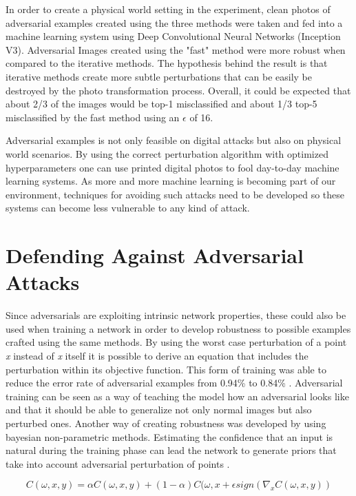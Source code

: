 In order to create a physical world setting in the experiment, clean photos of adversarial examples created using the three methods were taken and fed into a machine learning system using Deep Convolutional Neural Networks (Inception V3). Adversarial Images created using the "fast" method were more robust when compared to the iterative methods. The hypothesis behind the result is that iterative methods create more subtle perturbations that can be easily be destroyed by the photo transformation process. Overall, it could be expected that about 2/3 of the images would be top-1 misclassified and about 1/3 top-5 misclassified by the fast method using an $\epsilon$ of 16.

Adversarial examples is not only feasible on digital attacks but also on physical world scenarios. By using the correct perturbation algorithm with optimized hyperparameters one can use printed digital photos to fool day-to-day machine learning systems. As more and more machine learning is becoming part of our environment, techniques for avoiding such attacks need to be developed so these systems can become less vulnerable to any kind of attack.

\section{Defending Against Adversarial Attacks}\label{sec:robustness}

Since adversarials are exploiting intrinsic network properties, these could also be used when training a network in order to develop robustness to possible examples crafted using the same methods. By using the worst case perturbation of a point \textit{x} instead of \textit{x} itself it is possible to derive an equation that includes the perturbation within its objective function. This form of training was able to reduce the error rate of adversarial examples from 0.94\% to 0.84\% \cite{goodfellow2014}. Adversarial training can be seen as a way of teaching the model how an adversarial looks like and that it should be able to generalize not only normal images but also perturbed ones. Another way of creating robustness was developed by using bayesian non-parametric methods. Estimating the confidence that an input is natural during the training phase can lead the network to generate priors that take into account adversarial perturbation of points \cite{billovits}. 

$$ C(\omega,x,y) = \alpha C(\omega ,x,y) + (1-\alpha )C(\omega ,x+\epsilon sign(\nabla_{x}C(\omega,x,y))$$

